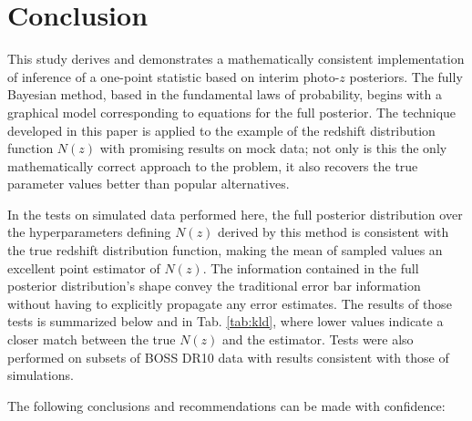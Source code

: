 \section{Conclusion}

This study derives and demonstrates a mathematically consistent implementation 
of inference of a one-point statistic based on interim photo-$z$ posteriors.  
The fully Bayesian method, based in the fundamental laws of probability, begins 
with a graphical model corresponding to equations for the full posterior.  The 
technique developed in this paper is applied to the example of the redshift 
distribution function $N(z)$ with promising results on mock data; not only is 
this the only mathematically correct approach to the problem, it also recovers 
the true parameter values better than popular alternatives.  

In the tests on simulated data performed here, the full posterior distribution 
over the hyperparameters defining $N(z)$ derived by this method is consistent 
with the true redshift distribution function, making the mean of sampled values 
an excellent point estimator of $N(z)$.  The information contained in the full 
posterior distribution's shape convey the traditional error bar information 
without having to explicitly propagate any error estimates.  The results of 
those tests is summarized below and in Tab. \ref{tab:kld}, where lower values 
indicate a closer match between the true $N(z)$ and the estimator.  Tests were 
also performed on subsets of BOSS DR10 data with results consistent with those 
of simulations.

The following conclusions and recommendations can be made with confidence:

